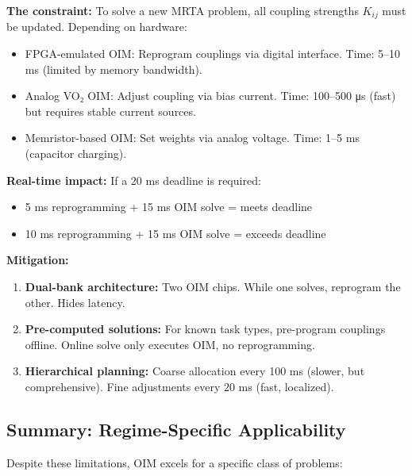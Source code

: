 \textbf{The constraint:} To solve a new MRTA problem, all coupling strengths $K_{ij}$ must be updated. Depending on hardware:
\begin{itemize}
\item FPGA-emulated OIM: Reprogram couplings via digital interface. Time: 5--10 ms (limited by memory bandwidth).
\item Analog VO₂ OIM: Adjust coupling via bias current. Time: 100--500 μs (fast) but requires stable current sources.
\item Memristor-based OIM: Set weights via analog voltage. Time: 1--5 ms (capacitor charging).
\end{itemize}

\textbf{Real-time impact:} If a 20 ms deadline is required:
\begin{itemize}
\item 5 ms reprogramming + 15 ms OIM solve = meets deadline
\item 10 ms reprogramming + 15 ms OIM solve = exceeds deadline
\end{itemize}

\textbf{Mitigation:}
\begin{enumerate}
\item \textbf{Dual-bank architecture:} Two OIM chips. While one solves, reprogram the other. Hides latency.
\item \textbf{Pre-computed solutions:} For known task types, pre-program couplings offline. Online solve only executes OIM, no reprogramming.
\item \textbf{Hierarchical planning:} Coarse allocation every 100 ms (slower, but comprehensive). Fine adjustments every 20 ms (fast, localized).
\end{enumerate}

\subsection{Summary: Regime-Specific Applicability}

Despite these limitations, OIM excels for a specific class of problems:

